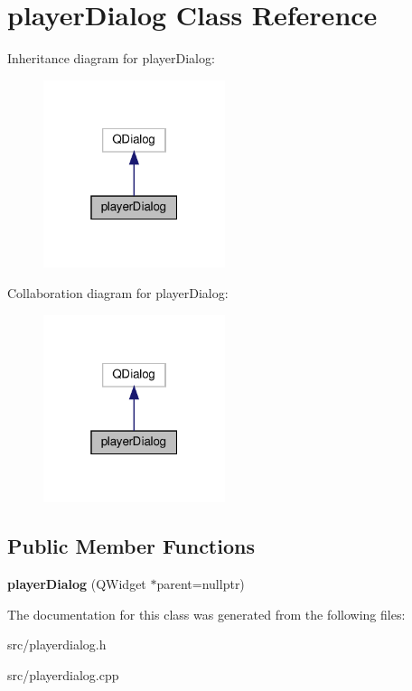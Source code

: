\hypertarget{classplayerDialog}{}\section{player\+Dialog Class Reference}
\label{classplayerDialog}


Inheritance diagram for player\+Dialog\+:\nopagebreak
\begin{figure}[H]
\begin{center}
\leavevmode
\includegraphics[width=151pt]{classplayerDialog__inherit__graph}
\end{center}
\end{figure}


Collaboration diagram for player\+Dialog\+:\nopagebreak
\begin{figure}[H]
\begin{center}
\leavevmode
\includegraphics[width=151pt]{classplayerDialog__coll__graph}
\end{center}
\end{figure}
\subsection*{Public Member Functions}
\begin{DoxyCompactItemize}
\item 
\mbox{\label{classplayerDialog_af0b84f32ec1181d738247502470e4d5e}} 
{\bfseries player\+Dialog} (Q\+Widget $\ast$parent=nullptr)
\end{DoxyCompactItemize}


The documentation for this class was generated from the following files\+:\begin{DoxyCompactItemize}
\item 
src/playerdialog.\+h\item 
src/playerdialog.\+cpp\end{DoxyCompactItemize}
